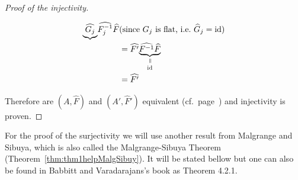 \begin{proof}[Proof of the injectivity]
\begin{itemize}
\begin{align*}
{{            \underbrace{%
              \hat{G_j}
            }
          }
        }
        \hat{F_j^{-1}} \hat F
                      & \text{(since $G_j$ is flat, i.e.\ $\hat G_j=\id$)}
        \\            &= \hat{F'}
        \underset{\id}{%
          \underset{\text{\rotatebox[origin=c]{-90}{$=$}}}{%
            \underbrace{%
              \hat{F^{-1}} \hat F
            }
          }
        }
        \\            &= \hat{F'}
      \end{align*}
  \end{itemize}
  Therefore are $(A,\hat F)$ and $(A',\hat F')$ equivalent
  (cf.\ page~\pageref{page:ofDefnOfIsomOfMarkedPairs}) and injectivity is
  proven.
  \iffalse
    \begin{comment}
      \textbf{First look at injectivity:}
      Consider the two elements $(\cM,\nabla,\hat f)$ and
      $(\cM',\nabla',\hat f')$ of $\cH(\cM^{nf},\nabla^{nf})$ which map to same
      cohomology class
      \[
        \exp([(\cM,\nabla,\hat f)])=\lambda=\exp([(\cM',\nabla',\hat f')])
          \in H^1(S^1;\Lambda(A^0)) \,.
      \]
      Since we can use refined coverings, it is possible to find a finite
      covering $\cU=\{U_j;j\in J\}$ of $S^1$ such that $\lambda$ is the class
      of the cocycles $(f_lf_j^{-1})$ and $(f_l',f_j'^{-1})$, where
      $f_j$,$f_j'$ are defined on $U_j$.
      Since $[(f_lf_j^{-1})]=[(f_l'f_j'^{-1})]$ there exists a $0$-cochain
      $(g_j)$ of the sheaf $\Aut^{<0}(\tilde\cM^{nf})$ relative to the covering
      $(I_j)$, such that
      \[
        f_l'f_j'^{-1}=g_lf_lf_j^{-1}g_j^{-1} \text{ on } I_j\cap I_l.
      \]
      If we set $\sigma=f_j^{-1}g_{j}^{-1}f_j'$ on $I_{j}$, we get a horizontal
      section\TODO[~on~???], thus\TODO[why?] it satisfies
      $\sigma\circ\hat{f'}=\hat f$. Therefore are $(\cM,\nabla,\hat f)$ and
      $(\cM',\nabla',\hat{f'})$ isomorphic and injectivity is proven.
    \end{comment}
  \fi
\end{proof}

For the proof of the surjectivity we will use another result from Malgrange and
Sibuya, which is also called the Malgrange-Sibuya Theorem
(Theorem~\ref{thm:thm1helpMalgSibuy}). It will be stated bellow but one can also
be found in Babbitt and Varadarajans's book \cite[65ff]{babbitt1989local} as
Theorem 4.2.1.

